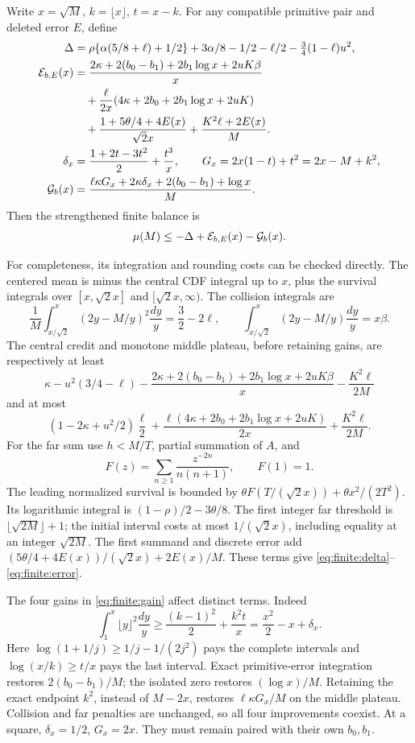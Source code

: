 \documentclass[11pt]{article}
\theoremstyle{definition}\newtheorem{definition}[theorem]{Definition}
\theoremstyle{remark}\newtheorem{remark}[theorem]{Remark}
\begin{document}
Write \(x=\sqrt M\), \(k=\lfloor x\rfloor\), \(t=x-k\).
For any compatible primitive pair and deleted error \(E\), define
\begin{align}
 \Delta&=\rho\{\alpha(5/8+\ell)+1/2\}
          +3\alpha/8-1/2-\ell/2-\tfrac34(1-\ell)u^2,
 \label{eq:finite:delta}\\
 {\cal E}_{b,E}(x)
 &=\frac{2\kappa+2(b_0-b_1)+2b_1\log x+2uK\beta}{x}\notag\\
 &\quad+\frac\ell{2x}(4\kappa+2b_0+2b_1\log x+2uK)\notag\\
 &\quad+\frac{1+5\theta/4+4E(x)}{\sqrt2 x}
 +\frac{K^2\ell+2E(x)}{M}. \label{eq:finite:error}\\
 \delta_x&=\frac{1+2t-3t^2}{2}+\frac{t^3}{x},\qquad
 G_x=2x(1-t)+t^2=2x-M+k^2, \notag\\
 {\cal G}_b(x)&=
 \frac{\ell\kappa G_x+2\kappa\delta_x
                  +2(b_0-b_1)+\log x}{M}. \label{eq:finite:gain}
\end{align}
Then the strengthened finite balance is
\begin{equation}
 \mu(M)\le-\Delta+{\cal E}_{b,E}(x)-{\cal G}_b(x).
 \label{eq:finite:strengthened}
\end{equation}

For completeness, its integration and rounding costs can be checked directly.
The centered mean is minus the central CDF integral up to \(x\), plus
the survival integrals over \([x,\sqrt2x]\) and \([\sqrt2x,\infty)\).
The collision integrals are
\[
 \frac1M\int_{x/\sqrt2}^x(2y-M/y)^2\frac{dy}{y}
       =\frac32-2\ell,\qquad
 \int_{x/\sqrt2}^x(2y-M/y)\frac{dy}{y}=x\beta .
\]
The central credit and monotone middle plateau, before retaining gains,
are respectively at least
\[
 \kappa-u^2(3/4-\ell)
 -\frac{2\kappa+2(b_0-b_1)+2b_1\log x+2uK\beta}{x}
 -\frac{K^2\ell}{2M}
\]
and at most
\[
 (1-2\kappa+u^2/2)\frac\ell2
 +\frac{\ell(4\kappa+2b_0+2b_1\log x+2uK)}{2x}
 +\frac{K^2\ell}{2M}.
\]
For the far sum use \(h<M/T\), partial summation of \(A\), and
\[
 F(z)=\sum_{n\ge1}\frac{z^{-2n}}{n(n+1)},\qquad F(1)=1.
\]
The leading normalized survival is bounded by
\(\theta F(T/(\sqrt2x))+\theta x^2/(2T^2)\).
Its logarithmic integral is \((1-\rho)/2-3\theta/8\).
The first integer far threshold is \(\lfloor\sqrt{2M}\rfloor+1\);
the initial interval costs at most \(1/(\sqrt2x)\), including equality
at an integer \(\sqrt{2M}\).  The first summand and discrete error add
\((5\theta/4+4E(x))/(\sqrt2x)+2E(x)/M\).
These terms give \eqref{eq:finite:delta}--\eqref{eq:finite:error}.

The four gains in \eqref{eq:finite:gain} affect distinct terms.
Indeed
\[
 \int_1^x\lfloor y\rfloor^2\frac{dy}{y}
 \ge\frac{(k-1)^2}{2}+\frac{k^2t}{x}
   =\frac{x^2}{2}-x+\delta_x .
\]
Here \(\log(1+1/j)\ge1/j-1/(2j^2)\) pays the complete intervals and
\(\log(x/k)\ge t/x\) pays the last interval.
Exact primitive-error integration restores \(2(b_0-b_1)/M\);
the isolated zero restores \((\log x)/M\).
Retaining the exact endpoint \(k^2\), instead of \(M-2x\), restores
\(\ell\kappa G_x/M\) on the middle plateau.
Collision and far penalties are unchanged, so all four improvements
coexist.  At a square, \(\delta_x=1/2\), \(G_x=2x\).
They must remain paired with their own \(b_0,b_1\).
\end{document}

